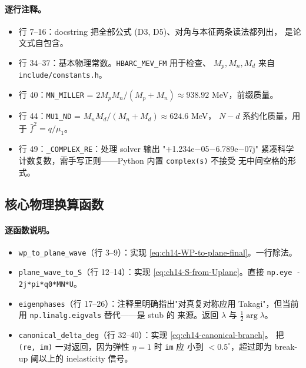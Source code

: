 \paragraph{逐行注释。}
\begin{itemize}
  \item 行 7--16：docstring 把全部公式 (D3, D5)、对角与本征两条读法都列出，
        是论文式自包含。
  \item 行 34--37：基本物理常数。\texttt{HBARC\_MEV\_FM} 用于检查、
        \(M_p, M_n, M_d\) 来自 \texttt{include/constants.h}。
  \item 行 40：\texttt{MN\_MILLER} = \(2 M_p M_n / (M_p + M_n) \approx
        938.92\) MeV，前缀质量。
  \item 行 44：\texttt{MU1\_ND} = \(M_n M_d / (M_n + M_d) \approx 624.6\) MeV，
        \(N\!-\!d\) 系约化质量，用于 \(\bar{f}^2 = q/\mu_1\)。
  \item 行 49：\texttt{\_COMPLEX\_RE}：处理 solver 输出 "\(+\)1.234e\(-\)05\(-\)6.789e\(-\)07j"
        紧凑科学计数复数，需手写正则——Python 内置 \texttt{complex(s)} 不接受
        无中间空格的形式。
\end{itemize}

\subsection{核心物理换算函数}
\label{subsec:ch14-py-physics}



\paragraph{逐函数说明。}
\begin{itemize}
  \item \texttt{wp\_to\_plane\_wave}（行 3--9）：实现
        \cref{eq:ch14-WP-to-plane-final}。一行除法。
  \item \texttt{plane\_wave\_to\_S}（行 12--14）：实现
        \cref{eq:ch14-S-from-Uplane}。直接 \verb|np.eye - 2j*pi*q0*MN*U|。
  \item \texttt{eigenphases}（行 17--26）：注释里明确指出"对真复对称应用
        Takagi"，但当前用 \verb|np.linalg.eigvals| 替代——是 stub 的
        来源。返回 \(\lambda\) 与 \(\tfrac{1}{2}\arg \lambda\)。
  \item \texttt{canonical\_delta\_deg}（行 32--40）：实现
        \cref{eq:ch14-canonical-branch}。
        把 \texttt{(re, im)} 一对返回，因为弹性 \(\eta = 1\) 时 \texttt{im} 应
        小到 \(< 0.5^\circ\)，超过即为 break-up 阈以上的 inelasticity 信号。
\end{itemize}

